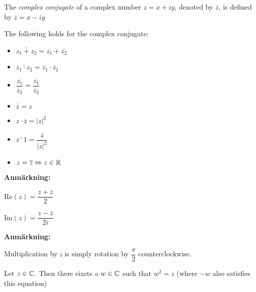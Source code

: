 \begin{theo}{}
  The \textit{complex conjugate} of a complex number $z = x+iy$, denoted by $\overline{z}$, is defined by $\overline{z} = x-iy$
  \par\bigskip
  \noindent The following holds for the complex conjugate:\par
  \begin{itemize}
    \item $\overline{z_1+z_2} = \overline{z_1}+\overline{z_2}$
    \item $\overline{z_1\cdot z_2} = \overline{z_1}\cdot\overline{z_2}$
    \item $\overline{\dfrac{z_1}{z_2}} = \dfrac{\overline{z_1}}{\overline{z_2}}$
    \item $\overline{\overline{z}} = z$
    \item $z\cdot\overline{z} = \left|z\right|^2$
    \item $z^-1 = \dfrac{\overline{z}}{\left|z\right|^2}$
    \item $z = \overline{z}\Leftrightarrow z\in\mathbb{R}$
  \end{itemize}
\end{theo}
\par\bigskip
\noindent\textbf{Anmärkning:}\par
\noindent Re$(z) = \dfrac{z+\overline{z}}{2}$\par
\noindent Im$(z) = \dfrac{z-\overline{z}}{2i}$
\par\bigskip
\noindent\textbf{Anmärkning:}\par
\noindent Multiplication by $i$ is simply rotation by $\dfrac{\pi}{2}$ counterclockwise.
\par\bigskip
\begin{theo}[]{}
  Let $z\in\mathbb{C}$. Then there eixsts a $w\in\mathbb{C}$ such that $w^2=z$ (where $-w$ also satisfies this equation)
\end{theo}
\par\bigskip
